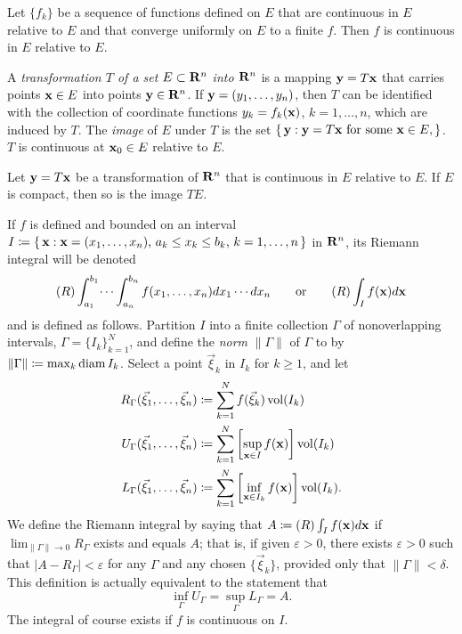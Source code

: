\begin{theorem}[1.16]
Let $\{f_k\}$ be a sequence of functions defined on $E$ that are continuous
in $E$ relative to $E$ and that converge uniformly on $E$ to a finite
$f$. Then $f$ is continuous in $E$ relative to $E$.
\end{theorem}

A \emph{transformation $T$ of a set $E\subset\mathbf{R}^n$ into $\mathbf{R}^n$} is a
mapping $\mathbf{y}=T\mathbf{x}$ that carries points $\mathbf{x}\in E$ into points
$\mathbf{y}\in\mathbf{R}^n$. If $\mathbf{y}=(y_1,\dotsc,y_n)$, then $T$ can be identified
with the collection of coordinate functions $y_k=f_k(\mathbf{x})$,
$k=1,\dotsc,n$, which are induced by $T$. The \emph{image} of $E$ under $T$
is the set $\left\{\,\mathbf{y}:\text{$\mathbf{y}=T\mathbf{x}$ for some $\mathbf{x}\in
    E$},\right\}$. $T$ is continuous at $\mathbf{x}_0\in E$ relative to $E$.

\begin{theorem}[1.17]
Let $\mathbf{y}=T\mathbf{x}$ be a transformation of $\mathbf{R}^n$ that is continuous in $E$
relative to $E$. If $E$ is compact, then so is the image $TE$.
\end{theorem}

If $f$ is defined and bounded on an interval
$I\coloneqq\left\{\,\mathbf{x}:\text{$\mathbf{x}=(x_1,\dotsc,x_n)$, $a_k\leq x_k\leq
    b_k$, $k=1,\dotsc,n$}\,\right\}$ in $\mathbf{R}^n$, its Riemann integral will
be denoted
\begin{equation}
  \label{eq:riemann-integral}
(R)\int_{a_1}^{b_1}\dotsi\int_{a_n}^{b_n}f(x_1,\dotsc,x_n) d
x_1\dotsm d  x_n
\qquad\text{or}\qquad
(R)\int_I f(\mathbf{x}) d \mathbf{x}
\end{equation}
and is defined as follows. Partition $I$ into a finite collection $\Gamma$
of nonoverlapping intervals, $\Gamma={\{I_k\}}_{k=1}^N$, and define the
\emph{norm} $\|\Gamma\|$ of $\Gamma$ to by $\|\Gamma\|\coloneqq\max_k \operatorname{diam}
I_k$. Select a point $\vec\xi_k$ in $I_k$ for $k\geq 1$, and let
\begin{equation}
\label{eq:riemannian-integral-partitions}
\begin{aligned}
R_\Gamma(\vec\xi_1,\dotsc,\vec\xi_n)&\coloneqq\sum_{k=1}^N f(\vec\xi_k)\operatorname{vol}(I_k)\\
U_\Gamma(\vec\xi_1,\dotsc,\vec\xi_n)&\coloneqq\sum_{k=1}^N\left[\sup_{\mathbf{x}\in I}
  f(\mathbf{x})\right]\operatorname{vol}(I_k)\\
L_\Gamma(\vec\xi_1,\dotsc,\vec\xi_n)&\coloneqq\sum_{k=1}^N\left[\inf_{\mathbf{x}\in
    I_k}f(\mathbf{x})\right]\operatorname{vol}(I_k).
\end{aligned}
\end{equation}
We define the Riemann integral by saying that $A\coloneqq (R)\int_I
f(\mathbf{x})d\mathbf{x}$ if $\lim_{\|\Gamma\|\to 0}R_\Gamma$ exists and equals
$A$; that is, if given $\varepsilon>0$, there exists $\varepsilon>0$ such
that $|A-R_\Gamma|<\varepsilon$ for any $\Gamma$ and any chosen
$\{\vec\xi_k\}$, provided only that $\|\Gamma\|<\delta$. This definition is
actually equivalent to the statement that
\begin{equation}
  \label{eq:upper-lower-rieemann-sums}
\inf_\Gamma U_\Gamma=\sup_\Gamma L_\Gamma=A.
\end{equation}
The integral of course exists if $f$ is continuous on $I$.


